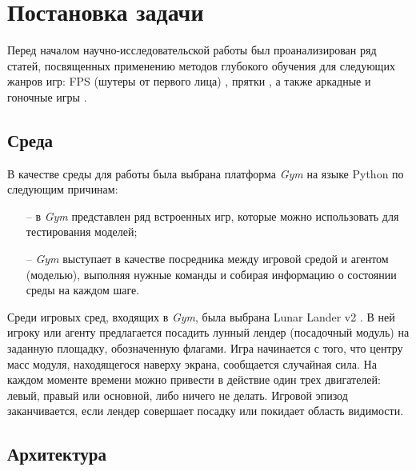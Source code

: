 \chapter{Постановка задачи}
\label{cha:analysis}
%
%

Перед началом научно-исследовательской работы был проанализирован ряд статей, посвященных применению методов глубокого обучения для следующих жанров игр: FPS (шутеры от первого лица) \cite{bergdahl2020augmenting}, прятки \cite{baker2019emergent}, а также аркадные и гоночные игры \cite{tufano2022using}.

\section{Среда}

В качестве среды для работы была выбрана платформа \textit{Gym} на языке Python \cite{Gym} по следующим причинам:
\begin{itemize}
	\item[--] в \textit{Gym} представлен ряд встроенных игр, которые можно использовать для тестирования моделей;
	\item[--] \textit{Gym} выступает в качестве посредника между игровой средой и агентом (моделью), выполняя нужные команды и собирая информацию о состоянии среды на каждом шаге.
\end{itemize}

Среди игровых сред, входящих в \textit{Gym}, была выбрана Lunar Lander v2 \cite{lunarlanderv2}. В ней игроку или агенту предлагается посадить лунный лендер (посадочный модуль) на заданную площадку, обозначенную флагами. Игра начинается с того, что центру масс модуля, находящегося наверху экрана, сообщается случайная сила. На каждом моменте времени можно привести в действие один трех двигателей: левый, правый или основной, либо ничего не делать. Игровой эпизод заканчивается, если лендер совершает посадку или покидает область видимости.

\section{Архитектура}

